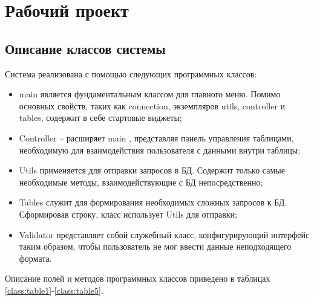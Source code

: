 \section{Рабочий проект}
\subsection{Описание классов системы}
Система реализована с помощью следующих программных классов:

\begin{itemize}
	\item \textquotedbl main \textquotedbl является фундаментальным классом для главного меню. Помимо основных свойств, таких как connection, экземпляров utils, controller и tables, содержит в себе стартовые виджеты;
	\item \textquotedbl Controller \textquotedbl -- расширяет \textquotedbl main \textquotedbl, представляя панель управления таблицами, необходимую для взаимодействия пользователя с данными внутри таблицы;
	\item \textquotedbl Utils \textquotedbl применяется для отправки запросов в БД. Содержит только самые необходимые методы, взаимодействующие с БД непосредственно;
	\item \textquotedbl Tables \textquotedbl служит для формирования необходимых сложных запросов к БД. Сформировав строку, класс использует \textquotedbl Utils \textquotedbl для отправки;
	\item \textquotedbl Validator \textquotedbl представляет собой служебный класс, конфигурирующий интерфейс таким образом, чтобы пользователь не мог ввести данные неподходящего формата.
\end{itemize}

Описание полей и методов программных классов приведено в таблицах \ref{class:table1}-\ref{class:table5}.

